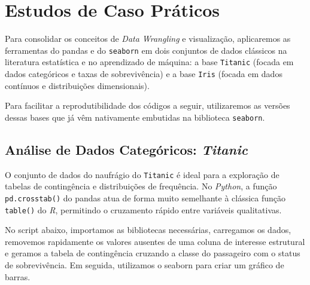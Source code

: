 \documentclass[
  brazilian,
  letterpaper,
  DIV=11,
  numbers=noendperiod]{scrreprt}
\begin{document}
\section{Estudos de Caso Práticos}\label{estudos-de-caso-pruxe1ticos}

Para consolidar os conceitos de \emph{Data Wrangling} e visualização,
aplicaremos as ferramentas do pandas e do \texttt{seaborn} em dois
conjuntos de dados clássicos na literatura estatística e no aprendizado
de máquina: a base \texttt{Titanic} (focada em dados categóricos e taxas
de sobrevivência) e a base \texttt{Iris} (focada em dados contínuos e
distribuições dimensionais).

Para facilitar a reprodutibilidade dos códigos a seguir, utilizaremos as
versões dessas bases que já vêm nativamente embutidas na biblioteca
\texttt{seaborn}.

\subsection{\texorpdfstring{Análise de Dados Categóricos:
\emph{Titanic}}{Análise de Dados Categóricos: Titanic}}\label{anuxe1lise-de-dados-categuxf3ricos-titanic}

O conjunto de dados do naufrágio do \texttt{Titanic} é ideal para a
exploração de tabelas de contingência e distribuições de frequência. No
\emph{Python}, a função \texttt{pd.crosstab()} do pandas atua de forma
muito semelhante à clássica função \texttt{table()} do \emph{R},
permitindo o cruzamento rápido entre variáveis qualitativas.

No script abaixo, importamos as bibliotecas necessárias, carregamos os
dados, removemos rapidamente os valores ausentes de uma coluna de
interesse estrutural e geramos a tabela de contingência cruzando a
classe do passageiro com o status de sobrevivência. Em seguida,
utilizamos o seaborn para criar um gráfico de barras.
\end{document}
